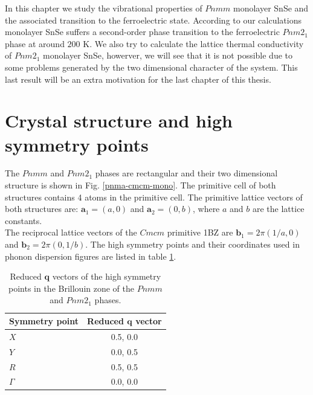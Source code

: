 In this chapter we study the vibrational properties of $Pnmm$ monolayer SnSe and the associated transition to the 
ferroelectric state. According to our calculations monolayer SnSe suffers a second-order phase transition to the 
ferroelectric $Pnm2_{1}$ phase at around $200$ K. We also try to calculate the lattice thermal conductivity of 
$Pnm2_{1}$ monolayer SnSe, howerver, we will see that it is not possible due to some problems generated by the two 
dimensional character of the system. This last result will be an extra  motivation for the last chapter of this 
thesis.

\section{Crystal structure and high symmetry points}

The $Pnmm$ and $Pnm2_{1}$ phases are rectangular and their two dimensional structure is shown in 
Fig. \ref{pnma-cmcm-mono}. The primitive cell of both structures contains 4 atoms in the primitive cell. The 
primitive lattice vectors of both structures are: $\mathbf{a}_{1}=(a,0)$ and $\mathbf{a}_{2}=(0,b)$, where $a$ and 
$b$ are the lattice constants. \\

The reciprocal lattice vectors of the $Cmcm$ primitive 1BZ are $\mathbf{b}_{1}=2\pi(1/a,0)$ and 
$\mathbf{b}_{2}=2\pi(0,1/b)$. The high symmetry points and their coordinates used in phonon dispersion figures are 
listed in table \ref{qpoints-mono}.
\begin{table}
\begin{center}
\begin{tabular*}{0.45\textwidth}{l c}
 \hline
 \hline
             Symmetry point  & Reduced $\mathbf{q}$ vector  \\
 \hline
 $X$                  &  0.5, 0.0 \\
 $Y$                  &  0.0, 0.5 \\
 $R$                  &  0.5, 0.5  \\
 $\Gamma$             &  0.0, 0.0  \\
 \hline
 \hline
\end{tabular*}
\end{center}
\caption{Reduced $\mathbf{q}$ vectors of the high symmetry points in the Brillouin zone of the $Pnmm$ and $Pnm2_{1}$ 
phases.}
\label{qpoints-mono}
\end{table}

